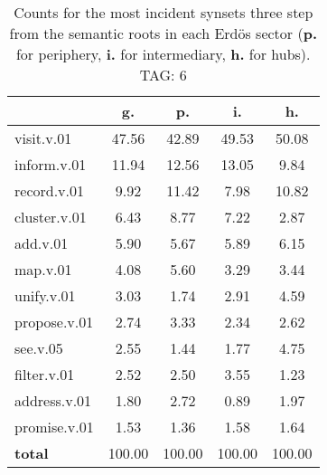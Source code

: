 \begin{table}[h!]
\begin{center}
\begin{tabular}{| l | c | c | c | c |}\hline
 & g. & p. & i. & h. \\\hline
visit.v.01 & 47.56  & 42.89  & 49.53  & 50.08 \\\hline
inform.v.01 & 11.94  & 12.56  & 13.05  & 9.84 \\\hline
record.v.01 & 9.92  & 11.42  & 7.98  & 10.82 \\\hline
cluster.v.01 & 6.43  & 8.77  & 7.22  & 2.87 \\\hline
add.v.01 & 5.90  & 5.67  & 5.89  & 6.15 \\\hline
map.v.01 & 4.08  & 5.60  & 3.29  & 3.44 \\\hline
unify.v.01 & 3.03  & 1.74  & 2.91  & 4.59 \\\hline
propose.v.01 & 2.74  & 3.33  & 2.34  & 2.62 \\\hline
see.v.05 & 2.55  & 1.44  & 1.77  & 4.75 \\\hline
filter.v.01 & 2.52  & 2.50  & 3.55  & 1.23 \\\hline
address.v.01 & 1.80  & 2.72  & 0.89  & 1.97 \\\hline
promise.v.01 & 1.53  & 1.36  & 1.58  & 1.64 \\\hline
{{\bf total}} & 100.00  & 100.00  & 100.00  & 100.00 \\\hline
\end{tabular}
\caption{Counts for the most incident synsets three step from the semantic roots in each Erd\"os sector ({\bf p.} for periphery, {\bf i.} for intermediary, {\bf h.} for hubs). TAG: 6}
\end{center}
\end{table}
